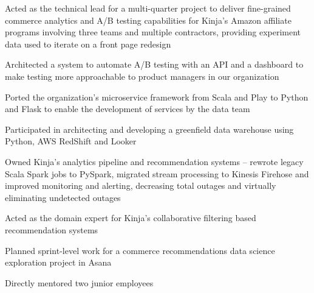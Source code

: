 \begin{job}

  \begin{accomplishments}
    \item Acted as the technical lead for a multi-quarter project to deliver
    fine-grained commerce analytics and A/B testing capabilities for Kinja's
    Amazon affiliate programs involving three teams and multiple contractors,
    providing experiment data used to iterate on a front page redesign
    \item Architected a system to automate A/B testing with an API and a
    dashboard to make testing more approachable to product managers in our
    organization
    \item Ported the organization's microservice framework from Scala and Play
    to Python and Flask to enable the development of services by the data team
    \item Participated in architecting and developing a greenfield data
    warehouse using Python, AWS RedShift and Looker
    \item Owned Kinja's analytics pipeline and recommendation systems -- rewrote
    legacy Scala Spark jobs to PySpark, migrated stream processing to Kinesis
    Firehose and improved monitoring and alerting, decreasing total outages and
    virtually eliminating undetected outages
    \item Acted as the domain expert for Kinja's collaborative filtering based
    recommendation systems
    \item Planned sprint-level work for a commerce recommendations data science
    exploration project in Asana
    \item Directly mentored two junior employees
  \end{accomplishments}
\end{job}
